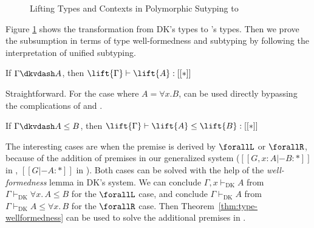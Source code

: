\begin{figure}
    \caption{Lifting Types and Contexts in Polymorphic Sutyping to \name}
    \label{fig:lift}
\end{figure}
Figure \ref{fig:lift} shows the transformation from
DK's types to \name's types.
Then we prove the subsumption in terms of type well-formedness and subtyping
by following the interpretation of unified subtyping.

\begin{theorem}
\label{thm:type-wellformedness}
    If $\Gamma \dkvdash A$, then $\lift{\Gamma} \vdash \lift{A} : [[*]]$
\end{theorem}

Straightforward. For the case where $A = \forall x. B$,  can be
used directly bypassing the complications of  and
.

\begin{theorem}
    If $\Gamma \dkvdash A \le B$, then $\lift{\Gamma} \vdash \lift{A} \le \lift{B} : [[*]]$
\end{theorem}

The interesting cases are when the premise is derived by $\forallL$ or $\forallR$,
because of the addition of premises in our generalized system
($[[G, x : A |- B : *]]$ in , $[[G |- A : *]]$ in ).
Both cases can be solved with the help of the \emph{well-formedness} lemma in
DK's system. We can conclude $\Gamma, x \vdash_{\text{DK}} A$ from
$\Gamma \vdash_{\text{DK}} \forall x.\, A \le B$ for the $\forallL$ case,
and conclude $\Gamma \vdash_{\text{DK}} A$ from $\Gamma \vdash_{\text{DK}} A \le \forall x.\, B$ for the $\forallR$ case.
Then Theorem~\ref{thm:type-wellformedness} can be used to solve the additional
premises in \name.
